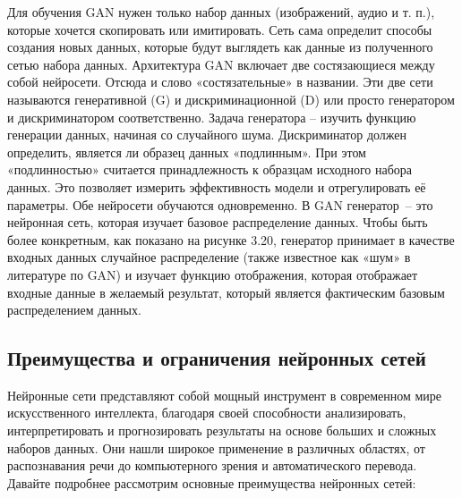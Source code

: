 Для обучения GAN нужен только набор данных (изображений, аудио и т. п.), которые хочется скопировать или имитировать. Сеть сама определит способы создания новых данных, которые будут выглядеть как данные из полученного сетью набора данных.
Архитектура GAN включает две состязающиеся между собой нейросети. Отсюда и слово «состязательные» в названии. Эти две сети называются генеративной (G) и дискриминационной (D) или просто генератором и дискриминатором соответственно. Задача генератора – изучить функцию генерации данных, начиная со случайного шума. Дискриминатор должен определить, является ли образец данных «подлинным». При этом «подлинностью» считается принадлежность к образцам исходного набора данных. Это позволяет измерить эффективность модели и отрегулировать её параметры. Обе нейросети обучаются одновременно.
В GAN генератор~-- это нейронная сеть, которая изучает базовое распределение данных. Чтобы быть более конкретным, как показано на рисунке 3.20,  генератор принимает в качестве входных данных случайное распределение (также известное как «шум» в литературе по GAN) и изучает функцию отображения, которая отображает входные данные в желаемый результат, который является фактическим базовым распределением данных.

\subsection{Преимущества и ограничения нейронных сетей}

Нейронные сети представляют собой мощный инструмент в современном мире искусственного интеллекта, благодаря своей способности анализировать, интерпретировать и прогнозировать результаты на основе больших и сложных наборов данных. Они нашли широкое применение в различных областях, от распознавания речи до компьютерного зрения и автоматического перевода. Давайте подробнее рассмотрим основные преимущества нейронных сетей:

